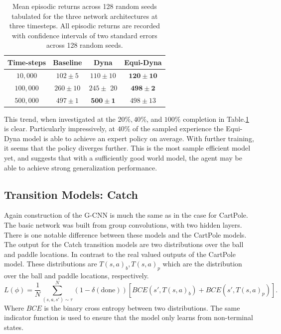 \begin{table}
	\centering
	\begin{tabular}{|c|c|c|c|}
		\hline
		Time-steps & Baseline     & Dyna                 & Equi-Dyna             \\
		\hline
		$10, 000$  & $102 \pm 5$  & $110 \pm 10$         & $\mathbf{120 \pm 10}$ \\
		$100, 000$ & $260 \pm 10$ & $245 \pm$ 20         & $\mathbf{498 \pm 2}$  \\
		$500,000$  & $497 \pm 1$  & $\mathbf{500 \pm 1}$ & $498 \pm 13$          \\
		\hline
	\end{tabular}
	\caption{Mean episodic returns across 128 random seeds tabulated for the three network architectures at three timesteps. All episodic returns are recorded with confidence intervals of two standard errors across 128 random seeds.}
	\label{tab:sup-dyna-cp}
\end{table}

This trend, when investigated at the $20\%, 40\%$, and $100\%$ completion in Table.\ref{tab:sup-dyna-cp} is clear. Particularly impressively, at $40\%$ of the sampled experience the Equi-Dyna model is able to achieve an expert policy on average. With further training, it seems that the policy diverges further. This is the most sample efficient model yet, and suggests that with a sufficiently good world model, the agent may be able to achieve strong generalization performance.
\subsection{Transition Models: Catch}\label{sec:tm_catch}

Again construction of the G-CNN is much the same as in the case for CartPole. The basic network was built from group convolutions, with two hidden layers. There is one notable difference between these models and the CartPole models. The output for the Catch transition models are two distributions over the ball and paddle locations. In contrast to the real valued outputs of the CartPole model. These distributions are $T(s, a)_b, T(s, a)_p$ which are the distribution over the ball and paddle locations, respectively.
\begin{equation}
	L(\phi) = \frac{1}{N}\sum_{(s, a, s') \sim \tau}^N(1- \delta (\text{done}))\left[BCE(s', T(s, a)_b) + BCE(s', T(s, a)_p)\right] .
\end{equation}
Where $BCE$ is the binary cross entropy between two distributions. The same indicator function is used to ensure that the model only learns from non-terminal states.

